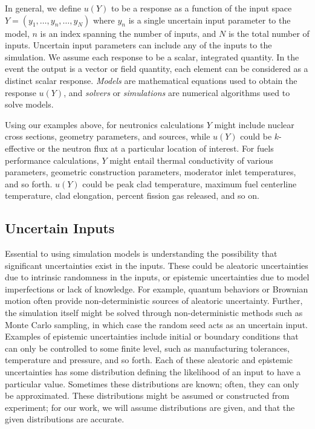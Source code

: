 In general, we define $u(Y)$ to be
a response as a function of the input space $Y = (y_1,\ldots,y_n,\ldots,y_N)$ where $y_n$ is a single
uncertain input
parameter to the model, $n$ is an index spanning the number of inputs, and $N$ is the total number of inputs.
Uncertain input parameters can include any of the inputs to the simulation.
We assume each response to be a scalar, integrated quantity.  In the event
the output is a vector or field quantity, each element can be considered as a distinct scalar response.
\emph{Models} are mathematical equations used to obtain the response $u(Y)$, and \emph{solvers} or
\emph{simulations} are numerical algorithms used to solve models.

Using our examples above, for neutronics calculations $Y$ might include nuclear cross sections, geometry
parameters, and sources, while $u(Y)$ could be $k$-effective or the neutron flux at a particular location of
interest.  For fuels performance calculations, $Y$ might entail thermal conductivity of various parameters,
geometric construction parameters, moderator inlet temperatures, and so forth.  $u(Y)$ could be peak clad
temperature, maximum fuel centerline temperature, clad elongation, percent fission gas released, and so on.

\subsection{Uncertain Inputs}
Essential to using simulation models is understanding the possibility that significant uncertainties exist in
the inputs.  These could be aleatoric uncertainties due to intrinsic randomness in the inputs, or epistemic
uncertainties due to model imperfections or lack of knowledge.  
For example, quantum behaviors or Brownian motion often provide non-deterministic sources of aleatoric uncertainty.
Further, the simulation itself might be solved through non-deterministic methods such as Monte Carlo sampling,
in which case the random seed acts as an uncertain input.  Examples of epistemic uncertainties include initial
or boundary conditions that can only be controlled to some finite level, such as manufacturing tolerances,
temperature and pressure, and so forth.
Each of these aleatoric and epistemic uncertainties has some
distribution defining the likelihood of an input to have a particular value.  Sometimes these distributions
are known; often, they can only be approximated.  These distributions might be
assumed or constructed from experiment; for our work, we will assume distributions are given, and that the given 
distributions are accurate.  


